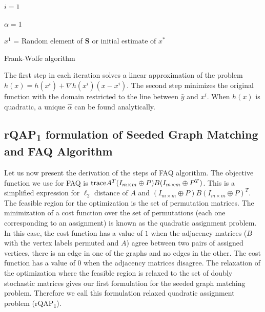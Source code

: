 \documentclass[12pt,oneside,final]{thesis}\usepackage[]{graphicx}\usepackage[]{color}
\begin{document}
\begin{algorithm}[H]
 \SetAlgoLined
 $i=1$\;
 
 $\alpha=1$\;
 
 $x^1$ = Random element of   $\mathbf{S}$  or initial estimate of $\mathit{x^*}$ \;
 
 \caption{Frank-Wolfe algorithm}
\end{algorithm}

The first step in each iteration solves a linear approximation of the problem $h(x)=h(x^i)+\nabla{h(x^i)}(x-x^i)$. The second step minimizes the original function with the domain restricted to the line between $\hat{y}$ and $x^{i}$. When $h(x)$ is quadratic, a unique  $\hat{\alpha}$ can be found analytically.

\subsection{rQAP\textsubscript{1} formulation of Seeded Graph Matching and FAQ Algorithm}
Let us now present the derivation of the steps of  FAQ algorithm.  The objective function we use for FAQ is $\textup{trace} {A^T(I_{m \times m}\oplus P)B(I_{m \times m}\oplus P^T)}$. This is a simplified expression for $\ell_2$ distance of $A$ and $(I_{m \times m}\oplus P)B(I_{m \times m}\oplus P)^T$. The feasible region for the optimization is the set of permutation matrices. The minimization of  a cost function over the set of permutations (each one corresponding to an assignment) is known as the quadratic assignment problem. In this case, the cost function has a value of $1$ when the adjacency matrices ($B$ with the vertex labels  permuted and  $A$) agree \ie between two pairs of assigned vertices, there is an edge in one of the graphs and no edges in the other.  The cost function has a value of $0$ when the adjacency matrices disagree.
The relaxation of the optimization where the feasible region is relaxed to the set of doubly stochastic matrices gives our first formulation for the seeded graph matching problem. Therefore we call this formulation relaxed quadratic assignment problem (rQAP\textsubscript{1}).
\end{document}
